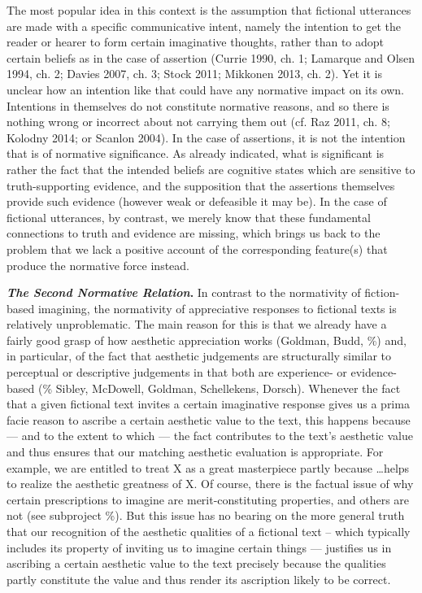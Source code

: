 The most popular idea in this context is the assumption that
fictional utterances are made with a specific communicative intent,
namely the intention to get the reader or hearer to form certain
imaginative thoughts, rather than to adopt certain beliefs as in the
case of assertion (Currie 1990, ch. 1; Lamarque and Olsen 1994, ch. 2;
Davies 2007, ch. 3; Stock 2011; Mikkonen 2013, ch. 2). Yet it is unclear
how an intention like that could have any normative impact on its own.
Intentions in themselves do not constitute normative reasons, and so
there is nothing wrong or incorrect about not carrying them out (cf. Raz
2011, ch. 8; Kolodny 2014; or Scanlon 2004). In the case of assertions,
it is not the intention that is of normative significance. As already
indicated, what is significant is rather the fact that the intended
beliefs are cognitive states which are sensitive to truth-supporting
evidence, and the supposition that the assertions themselves provide
such evidence (however weak or defeasible it may be). In the case of
fictional utterances, by contrast, we merely know that these fundamental
connections to truth and evidence are missing, which brings us back to
the problem that we lack a positive account of the corresponding
feature(s) that produce the normative force instead.

\vspace{.2cm}
\noindent\textbf{\emph{The Second Normative Relation}.} In contrast to the
normativity of fiction-based imagining, the normativity of appreciative
responses to fictional texts is relatively unproblematic. The main
reason for this is that we already have a fairly good grasp of how
aesthetic appreciation works (Goldman, Budd, \%) and, in particular, of
the fact that aesthetic judgements are structurally similar to
perceptual or descriptive judgements in that both are experience- or
evidence-based (\% Sibley, McDowell, Goldman, Schellekens, Dorsch).
Whenever the fact that a given fictional text invites a certain
imaginative response gives us a prima facie reason to ascribe a certain
aesthetic value to the text, this happens because --- and to the extent
to which --- the fact contributes to the text's aesthetic value and thus
ensures that our matching aesthetic evaluation is appropriate. For
example, we are entitled to treat X as a great masterpiece partly
because \ldots helps to realize the aesthetic greatness of X. Of
course, there is the factual issue of why certain prescriptions to
imagine are merit-constituting properties, and others are not (see
subproject \%). But this issue has no bearing on the more general truth
that our recognition of the aesthetic qualities of a fictional text --
which typically includes its property of inviting us to imagine certain
things --- justifies us in ascribing a certain aesthetic value to the
text precisely because the qualities partly constitute the value and
thus render its ascription likely to be correct.

